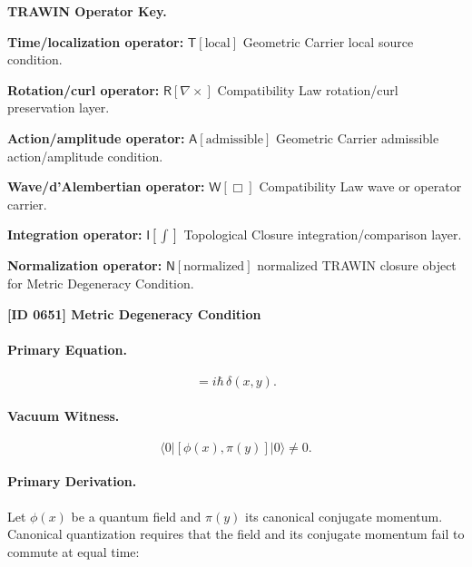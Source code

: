 \par\vspace{0.45\baselineskip}
\noindent\begin{minipage}[t]{\linewidth}
\begingroup
\small
\raggedright
\textbf{TRAWIN Operator Key.}\par
\noindent\textbf{Time/localization operator:} $\mathsf{T}\!\left[\mathrm{local}\right]$ Geometric Carrier local source condition.\par
\noindent\textbf{Rotation/curl operator:} $\mathsf{R}\!\left[\nabla\times\right]$ Compatibility Law rotation/curl preservation layer.\par
\noindent\textbf{Action/amplitude operator:} $\mathsf{A}\!\left[\mathrm{admissible}\right]$ Geometric Carrier admissible action/amplitude condition.\par
\noindent\textbf{Wave/d'Alembertian operator:} $\mathsf{W}\!\left[\Box\right]$ Compatibility Law wave or operator carrier.\par
\noindent\textbf{Integration operator:} $\mathsf{I}\!\left[\int\right]$ Topological Closure integration/comparison layer.\par
\noindent\textbf{Normalization operator:} $\mathsf{N}\!\left[\mathrm{normalized}\right]$ normalized TRAWIN closure object for Metric Degeneracy Condition.\par
\endgroup
\end{minipage}

\clearpage
\noindent\textbf{[ID 0651] Metric Degeneracy Condition}\par
\vspace{0.35em}
\paragraph{Primary Equation.}
\begin{equation}
[\phi(x),\pi(y)] = i\hbar\,\delta(x,y).
\end{equation}

\paragraph{Vacuum Witness.}
\begin{equation}
\langle 0|[\phi(x),\pi(y)]|0\rangle \neq 0 .
\end{equation}

\paragraph{Primary Derivation.}
Let $\phi(x)$ be a quantum field and $\pi(y)$ its canonical conjugate momentum.  
Canonical quantization requires that the field and its conjugate momentum fail to commute at equal time:

